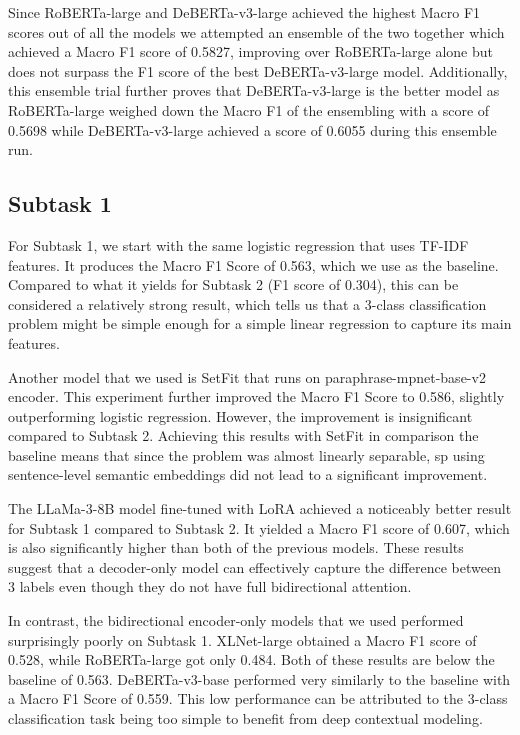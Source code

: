 \documentclass[11pt]{article}
\begin{document}
Since RoBERTa-large and DeBERTa-v3-large achieved the highest Macro F1 scores out of all the models we attempted an ensemble of the two together which achieved a Macro F1 score of 0.5827, improving over RoBERTa-large alone but does not surpass the F1 score of the best DeBERTa-v3-large model. Additionally, this ensemble trial further proves that  DeBERTa-v3-large is the better model as RoBERTa-large weighed down the Macro F1 of the ensembling with a score of 0.5698 while DeBERTa-v3-large achieved a score of 0.6055 during this ensemble run.

\subsection{Subtask 1}
For Subtask 1, we start with the same logistic regression that uses TF-IDF features. It produces the Macro F1 Score of 0.563, which we use as the baseline. Compared to what it yields for Subtask 2 (F1 score of 0.304), this can be considered a relatively strong result, which tells us that a 3-class classification problem might be simple enough for a simple linear regression to capture its main features.

Another model that we used is SetFit \cite{pannerselvam-etal-2024-setfit} that runs on paraphrase-mpnet-base-v2 encoder. This experiment further improved the Macro F1 Score to 0.586, slightly outperforming logistic regression. However, the improvement is insignificant compared to Subtask 2. Achieving this results with SetFit in comparison the baseline means that since the problem was almost linearly separable, sp using sentence-level semantic embeddings did not lead to a significant improvement.

The LLaMa-3-8B model fine-tuned with LoRA achieved a noticeably better result for Subtask 1 compared to Subtask 2. It yielded a Macro F1 score of 0.607, which is also significantly higher than both of the previous models. These results suggest that a decoder-only model can effectively capture the difference between 3 labels even though they do not have full bidirectional attention.

In contrast, the bidirectional encoder-only models that we used performed surprisingly poorly on Subtask 1. XLNet-large \cite{yang2019xlnet} obtained a Macro F1 score of 0.528, while RoBERTa-large \cite{liu2020roberta} got only 0.484. Both of these results are below the baseline of 0.563. DeBERTa-v3-base \cite{DeBERTaV3} performed very similarly to the baseline with a Macro F1 Score of 0.559. This low performance can be attributed to the 3-class classification task being too simple to benefit from deep contextual modeling.
\end{document}
